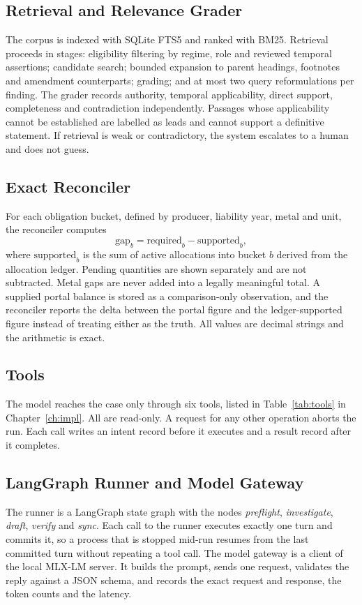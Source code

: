 \subsection{Retrieval and Relevance Grader}
The corpus is indexed with SQLite FTS5 and ranked with BM25. Retrieval proceeds in stages: eligibility
filtering by regime, role and reviewed temporal assertions; candidate search; bounded expansion to parent
headings, footnotes and amendment counterparts; grading; and at most two query reformulations per finding.
The grader records authority, temporal applicability, direct support, completeness and contradiction
independently. Passages whose applicability cannot be established are labelled as leads and cannot support a
definitive statement. If retrieval is weak or contradictory, the system escalates to a human and does not
guess.

\subsection{Exact Reconciler}
For each obligation bucket, defined by producer, liability year, metal and unit, the reconciler computes
\begin{equation}
\text{gap}_b = \text{required}_b - \text{supported}_b,
\end{equation}
where $\text{supported}_b$ is the sum of active allocations into bucket $b$ derived from the allocation
ledger. Pending quantities are shown separately and are not subtracted. Metal gaps are never added into a
legally meaningful total. A supplied portal balance is stored as a comparison-only observation, and the
reconciler reports the delta between the portal figure and the ledger-supported figure instead of
treating either as the truth. All values are decimal strings and the arithmetic is exact.

\subsection{Tools}
The model reaches the case only through six tools, listed in Table~\ref{tab:tools} in Chapter~\ref{ch:impl}.
All are read-only. A request for any other operation aborts the run. Each call writes an intent record before
it executes and a result record after it completes.

\subsection{LangGraph Runner and Model Gateway}
The runner is a LangGraph state graph with the nodes \emph{preflight}, \emph{investigate}, \emph{draft},
\emph{verify} and \emph{sync}. Each call to the runner executes exactly one turn and commits it, so a process
that is stopped mid-run resumes from the last committed turn without repeating a tool call. The model gateway
is a client of the local MLX-LM server. It builds the prompt, sends one request, validates the reply against a
JSON schema, and records the exact request and response, the token counts and the latency.

